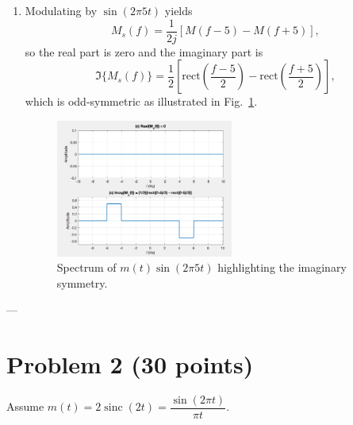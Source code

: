 \documentclass[12pt]{article}
\DeclareMathOperator{\sinc}{sinc}
\begin{document}
\begin{enumerate}[label=(\alph*)]
\item Modulating by \(\sin(2\pi 5t)\) yields
\[
M_s(f) = \frac{1}{2j}\left[ M(f-5) - M(f+5) \right],
\]
so the real part is zero and the imaginary part is
\[
\Im\{M_s(f)\} = \frac{1}{2}\left[\mathrm{rect}\left(\frac{f-5}{2}\right) - \mathrm{rect}\left(\frac{f+5}{2}\right)\right],
\]
which is odd-symmetric as illustrated in Fig.~\ref{fig:prob1c}.

\begin{figure}[H]
\centering
\includegraphics[width=0.55\textwidth]{images/Question1/1c.png}
\caption{Spectrum of \(m(t)\sin(2\pi 5t)\) highlighting the imaginary symmetry.}
\label{fig:prob1c}
\end{figure}
\end{enumerate}

---

\newpage

\section*{Problem 2 (30 points)}

Assume \(m(t) = 2\sinc(2t) = \dfrac{\sin(2\pi t)}{\pi t}\).
\end{document}
